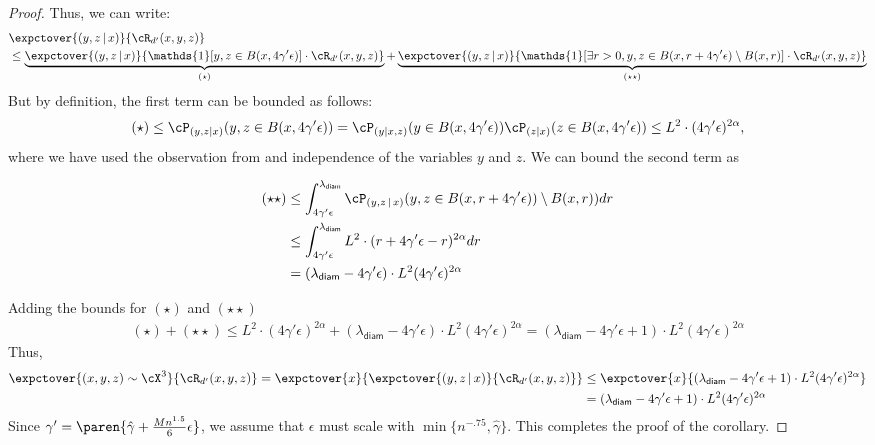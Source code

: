\begin{proof}
Thus, we can write:
\begin{align*}
    &\expctover{(y,z\,|\,x)}{\cR_{d'}(x,y,z)}\\
    &\le \underbrace{\expctover{(y,z\,|\,x)}{\mathds{1}[y,z \in B(x,4\gamma'\epsilon)]\cdot \cR_{d'}(x,y,z)}}_{(\star)} + \underbrace{\expctover{(y,z\,|\,x)}{\mathds{1}[\exists r>0, y,z \in B(x,r + 4\gamma'\epsilon)\setminus B(x,r)]\cdot\cR_{d'}(x,y,z)}}_{(\star \star)}
\end{align*}
But by definition, the first term can be bounded as follows:
\begin{align*}
    (\star) \le \cP_{(y,z|x)} (y,z \in B(x,4\gamma'\epsilon)) = \cP_{(y|x,z)} (y \in B(x,4\gamma'\epsilon)) \cP_{(z|x)} (z \in B(x,4\gamma'\epsilon)) \le L^2\cdot (4\gamma'\epsilon)^{2\alpha},
\end{align*}
where we have used the observation from  and independence of the variables $y$ and $z$. We can bound the second term as
\begin{center}
\begin{align*}
    (\star \star) &\le   \int_{4\gamma'\epsilon}^{\lambda_{\textsf{diam}}} \cP_{(y,z\,|\, x)}( y,z \in B(x,r+4\gamma'\epsilon))\setminus B(x,r)) d r\\
    & \le \int_{4\gamma'\epsilon}^{\lambda_{\textsf{diam}}} L^2\cdot (r + 4\gamma'\epsilon  - r )^{2\alpha} dr\\
    &= (\lambda_{\textsf{diam}} - 4\gamma'\epsilon)\cdot L^2(4\gamma'\epsilon)^{2\alpha}
\end{align*}
\end{center}
Adding the bounds for $(\star)$ and $(\star\star)$
\begin{align}
    (\star) + (\star \star) \le L^2\cdot (4\gamma'\epsilon)^{2\alpha} + (\lambda_{\textsf{diam}} - 4\gamma'\epsilon)\cdot L^2(4\gamma'\epsilon)^{2\alpha} = (\lambda_{\textsf{diam}} - 4\gamma'\epsilon + 1)\cdot L^2(4\gamma'\epsilon)^{2\alpha} %
\end{align}
Thus,
\begin{align*}
    \expctover{(x,y,z) \sim \cX^3}{\cR_{d'}(x,y,z)} = \expctover{x}{\expctover{(y,z\,|\,x)}{\cR_{d'}(x,y,z)}} &\le \expctover{x}{ (\lambda_{\textsf{diam}} - 4\gamma'\epsilon + 1)\cdot L^2(4\gamma'\epsilon)^{2\alpha}}\\
    &=  (\lambda_{\textsf{diam}} - 4\gamma'\epsilon + 1)\cdot L^2(4\gamma'\epsilon)^{2\alpha}
\end{align*}
Since $\gamma' =  \paren{\hat{\gamma} + \frac{Mn^{1.5}}{6}\epsilon}$, we assume that $\epsilon$ must scale with $\min\{n^{-.75}, \hat{\gamma}\}$. This completes the proof of the corollary.

\end{proof}
